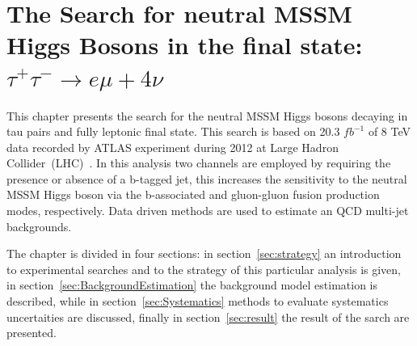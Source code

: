 \chapter[Neutral MSSM Higgs Search...]{The Search for neutral MSSM Higgs Bosons in the final state:
$\tau^{+}\tau^{-} \rightarrow e \mu + 4\nu$} \label{chap:anal}

%
%

This chapter presents the search for the neutral MSSM Higgs bosons decaying in tau pairs
and fully leptonic final state. This search is based on 20.3 $fb^{-1}$ of 8 TeV data 
recorded by ATLAS experiment during 2012 at Large Hadron Collider~(LHC)~\cite{LHC}.
In this analysis two channels are employed by requiring the
presence or absence of a b-tagged jet, this increases the 
sensitivity to the neutral MSSM Higgs boson via
the b-associated and gluon-gluon fusion production modes,
respectively. Data driven methods are used to estimate \Ztautau an QCD multi-jet backgrounds.

The chapter is divided in four sections: in section~\ref{sec:strategy} an introduction to experimental searches and to the strategy
of this particular analysis is given, in section~\ref{sec:BackgroundEstimation} the background model estimation is described, 
while in section~\ref{sec:Systematics} methods to evaluate systematics uncertaities are discussed, finally 
in section~\ref{sec:result} the result of the sarch are presented.



